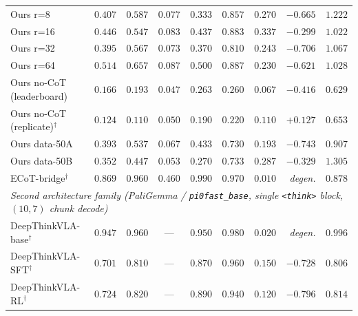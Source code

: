 \begin{table}[t]
{\begin{tabular}{lcccccrrr}
\midrule
Ours r=8              & $0.407$ & $0.587$ & $0.077$ & $0.333$ & $0.857$ & $0.270$ & $-0.665$ & $1.222$ \\
Ours r=16             & $0.446$ & $0.547$ & $0.083$ & $0.437$ & $0.883$ & $0.337$ & $-0.299$ & $1.022$ \\
Ours r=32             & $0.395$ & $0.567$ & $0.073$ & $0.370$ & $0.810$ & $0.243$ & $-0.706$ & $1.067$ \\
Ours r=64             & $0.514$ & $0.657$ & $0.087$ & $0.500$ & $0.887$ & $0.230$ & $-0.621$ & $1.028$ \\
Ours no-CoT (leaderboard)          & $0.166$ & $0.193$ & $0.047$ & $0.263$ & $0.260$ & $0.067$ & $-0.416$ & $0.629$ \\
Ours no-CoT (replicate)$^\dagger$  & $0.124$ & $0.110$ & $0.050$ & $0.190$ & $0.220$ & $0.110$ & $\mathbf{+0.127}$ & $0.653$ \\
Ours data-50A         & $0.393$ & $0.537$ & $0.067$ & $0.433$ & $0.730$ & $0.193$ & $-0.743$ & $0.907$ \\
Ours data-50B         & $0.352$ & $0.447$ & $0.053$ & $0.270$ & $0.733$ & $0.287$ & $-0.329$ & $1.305$ \\
ECoT-bridge$^\dagger$ & $0.869$ & $0.960$ & $0.460$ & $0.990$ & $0.970$ & $\mathbf{0.010}$ & \emph{degen.} & $0.878$ \\
\midrule
\multicolumn{9}{l}{\emph{Second architecture family (PaliGemma / \texttt{pi0fast\_base}, single \texttt{<think>} block, $(10,7)$ chunk decode)}} \\
DeepThinkVLA-base$^\dagger$ & $0.947$ & $0.960$ & --- & $0.950$ & $0.980$ & $\mathbf{0.020}$ & \emph{degen.} & $0.996$ \\
DeepThinkVLA-SFT$^\dagger$  & $0.701$ & $0.810$ & --- & $0.870$ & $0.960$ & $0.150$ & $-0.728$ & $0.806$ \\
DeepThinkVLA-RL$^\dagger$   & $0.724$ & $0.820$ & --- & $0.890$ & $0.940$ & $0.120$ & $-0.796$ & $0.814$ \\
\bottomrule
\end{tabular}}
\end{table}

